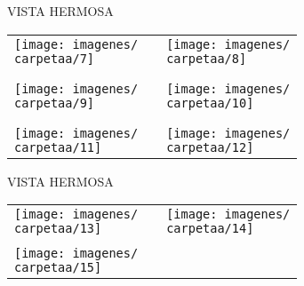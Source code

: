 \documentclass[10pt,letter]{report}
\begin{document}
\begin{center}
	\textcolor{principal}{VISTA HERMOSA}
\end{center}
\begin{table}[H]
\centering

\footnotesize
	\begin{tabular}{m{7cm}m{1cm}m{7cm}}
	
		\texttt{[image: imagenes/\\carpetaa/7]}&&\texttt{[image: imagenes/\\carpetaa/8]}\\
	\\
	\\
	
	\texttt{[image: imagenes/\\carpetaa/9]}&&\texttt{[image: imagenes/\\carpetaa/10]}\\
	\\
	\\
	\texttt{[image: imagenes/\\carpetaa/11]}&&\texttt{[image: imagenes/\\carpetaa/12]}
	
	\end{tabular}
	
\end{table}
\newpage

\newpage

\begin{center}
	\textcolor{principal}{VISTA HERMOSA}
\end{center}
\begin{table}[H]
\centering

\footnotesize
	\begin{tabular}{m{7cm}m{1cm}m{7cm}}
	
	\texttt{[image: imagenes/\\carpetaa/13]}&&\texttt{[image: imagenes/\\carpetaa/14]}
	\\
	\\
	\texttt{[image: imagenes/\\carpetaa/15]}&&
	
	\end{tabular}
	
\end{table}
\label{lastpage}
\newpage
\end{document}
